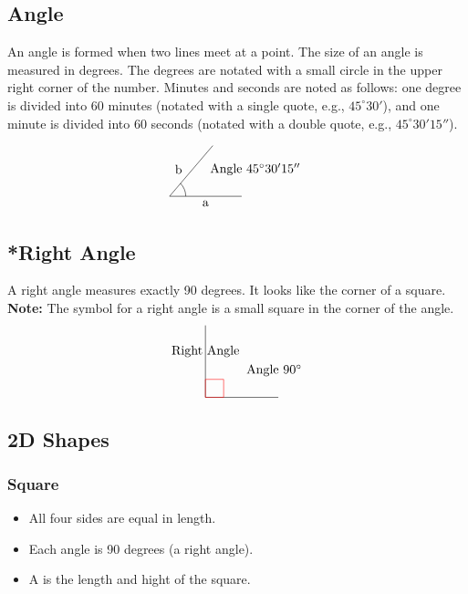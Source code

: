 \subsection{Angle}
An angle is formed when two lines meet at a point. The size of an angle is measured in degrees. The degrees are notated with a small circle in the upper right corner of the number. Minutes and seconds are noted as follows: one degree is divided into 60 minutes (notated with a single quote, e.g., \(45^\circ 30'\)), and one minute is divided into 60 seconds (notated with a double quote, e.g., \(45^\circ 30' 15''\)).

\[
\begin{tikzpicture}
    \draw (0,0) -- (2,0);
    \node[below] at (1,0) {a};
    \draw (0,0) -- (1.2,1.4);
    \node[above] at (0.25,0.5) {b};
    \node[right] at (1,0.75) {Angle \(45^\circ 30' 15''\)};
    \draw (0.45,0) arc[start angle=0, end angle=45.5042, radius=0.5];
\end{tikzpicture}
\]

\subsection{*Right Angle}
A right angle measures exactly 90 degrees. It looks like the corner of a square.
\textbf{Note:} The symbol for a right angle is a small square in the corner of the angle.
\[
\begin{tikzpicture}
    \draw (0,0) -- (2,0);
    \draw (0,0) -- (0,2);
    \node[right] at (1,0.75) {Angle \(90^\circ\)};
    \node[above] at (0,1) {Right Angle};
    \draw[red] (0,0) rectangle (0.5,0.5);
\end{tikzpicture}
\]

\subsection{2D Shapes}
\subsubsection{Square}
\begin{itemize}
    \item All four sides are equal in length.
    \item Each angle is 90 degrees (a right angle).
    \item A is the length and hight of the square.
\end{itemize}

